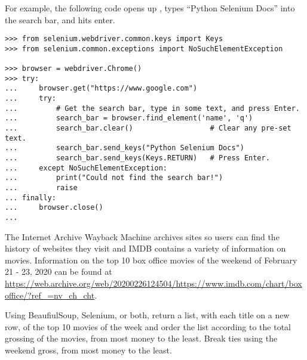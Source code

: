 For example, the following code opens up , types ``Python Selenium Docs'' into the search bar, and hits enter.

\begin{lstlisting}
>>> from selenium.webdriver.common.keys import Keys
>>> from selenium.common.exceptions import NoSuchElementException

>>> browser = webdriver.Chrome()
>>> try:
...     browser.get("https://www.google.com")
...     try:
...         # Get the search bar, type in some text, and press Enter.
...         search_bar = browser.find_element('name', 'q')
...         search_bar.clear()                  # Clear any pre-set text.
...         search_bar.send_keys("Python Selenium Docs")
...         search_bar.send_keys(Keys.RETURN)   # Press Enter.
...     except NoSuchElementException:
...         print("Could not find the search bar!")
...         raise
... finally:
...     browser.close()
...
\end{lstlisting}


\begin{comment} %
To illustrate that using Selenium solves the problem of asynchronously-loaded content, use it to load the soccer statistics page from the previous example.
\begin{lstlisting}
>>> browser = webdriver.Chrome()
>>> soccer_url = "http://www.simplesoccerstats.com/stats/teamstats.php?lge=14&type=goals&season=0"
>>> browser.get(soccer_url)
>>> soccer_soup = BeautifulSoup(browser.page_source)
>>> browser.quit() # Closes the web browser.
>>> print(soccer_soup.find(string='Chicago').parent)
<<<td>Chicago</td>>>
\end{lstlisting}
Notice that there is now a tag containing \li{"Chicago"}.
\end{comment}


\begin{problem} %

The Internet Archive Wayback Machine archives sites so users can find the history of websites they visit and IMDB contains a variety of information on movies. Information on the top 10 box office movies of the weekend of February 21 - 23, 2020 can be found at \url{https://web.archive.org/web/20200226124504/https://www.imdb.com/chart/boxoffice/?ref_=nv_ch_cht}.

Using BeaufiulSoup, Selenium, or both, return a list, with each title on a new row, of the top 10 movies of the week and order the list according to the total grossing of the movies, from most money to the least. Break ties using the weekend gross, from most money to the least.
\end{problem}


